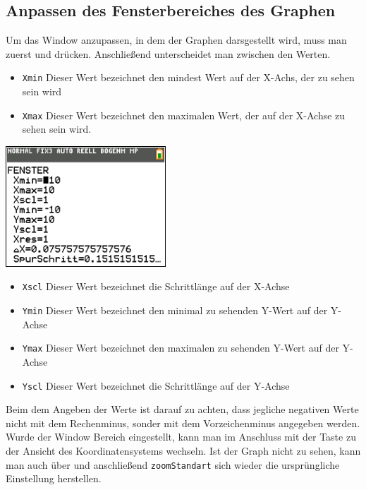 \subsection{Anpassen des Fensterbereiches des Graphen}\label{sec:Anpassen des Fensterbereiches des Graphen}
\begin{paracol}{2}
\begin{flushleft}
Um das Window anzupassen, in dem der Graphen darsgestellt wird, muss man zuerst  und  drücken. Anschließend unterscheidet man zwischen den Werten. 
	\begin{itemize}
		\item[] \texttt{Xmin} Dieser Wert bezeichnet den mindest Wert auf der X-Achs, der zu sehen sein wird
		\item[] \texttt{Xmax} Dieser Wert bezeichnet den maximalen Wert, der auf der X-Achse zu sehen sein wird.
	\end{itemize}

\end{flushleft}	
\switchcolumn
\begin{flushright}
\includegraphics[width=6cm]{Media/GRT/Visualisierung/Fensterbereich_anpassen/fenster}
\end{flushright}
\end{paracol}

\begin{itemize}
	\item[] \texttt{Xscl} Dieser Wert bezeichnet die Schrittlänge auf der X-Achse 
	\item[] \texttt{Ymin} Dieser Wert bezeichnet den minimal zu sehenden Y-Wert auf der Y-Achse
	\item[] \texttt{Ymax} Dieser Wert bezeichnet den maximalen zu sehenden Y-Wert auf der Y-Achse
	\item[] \texttt{Yscl} Dieser Wert bezeichnet die Schrittlänge auf der Y-Achse
\end{itemize} Beim dem Angeben der Werte ist darauf zu achten, dass jegliche negativen Werte nicht mit dem Rechenminus, sonder mit dem Vorzeichenminus angegeben werden. Wurde der Window Bereich eingestellt, kann man im Anschluss mit der Taste  zu der Ansicht des Koordinatensystems wechseln.
Ist der Graph nicht zu sehen, kann man auch über  und anschließend \texttt{zoomStandart} sich wieder die ursprüngliche Einstellung herstellen. 

